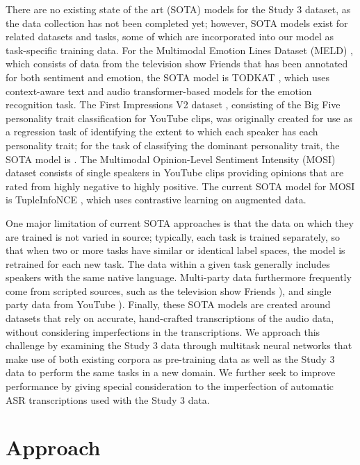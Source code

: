 There are no existing state of the art (SOTA) models for the Study 3 dataset, as the
data collection has not been completed yet; however, SOTA models
exist for related datasets and tasks, some of which are incorporated into our
model as task-specific training data. For the Multimodal Emotion Lines Dataset (MELD)
\cite{Poria.ea:2019}, which consists of data from the television show Friends that
has been annotated for both sentiment and emotion, the
SOTA model is TODKAT \cite{Zhu.ea:2021}, which uses context-aware
text and audio transformer-based models for the emotion recognition task. The
First Impressions V2 dataset \cite{Ponce-Lopez.ea:2016}, consisting of the Big
Five personality trait classification for YouTube clips, was originally created
for use as a regression task of identifying the extent to which each speaker
has each personality trait; for the task of classifying the dominant personality
trait, the SOTA model is \citet{Culnan.ea:2021}. The Multimodal Opinion-Level
Sentiment Intensity (MOSI) dataset \cite{Zadeh.ea:2016} consists of single
speakers in YouTube clips providing opinions that are rated from highly
negative to highly positive. The current SOTA model for MOSI is
TupleInfoNCE \cite{Liu.ea:2021}, which uses contrastive learning on augmented
data.

One major limitation of current SOTA approaches is that the data on which they
are trained is not varied in source; typically, each task is trained
separately, so that when two or more tasks have similar or identical label
spaces, the model is retrained for each new task. The data within a given task
generally includes speakers with the same native language.  Multi-party data
furthermore frequently come from scripted sources, such as the television show
Friends \cite{Poria.ea:2019, Zhu.ea:2021}), and single party data from YouTube
\cite{Zadeh.ea:2016, Ponce-Lopez.ea:2016}). Finally, these SOTA models are
created around datasets that rely on accurate, hand-crafted transcriptions of
the audio data, without considering imperfections in the transcriptions. We
approach this challenge by examining the Study 3 data through multitask neural
networks that make use of both existing corpora as pre-training data as well as
the Study 3 data to perform the same tasks in a new domain. We further seek to
improve performance by giving special consideration to the imperfection of
automatic ASR transcriptions used with the Study 3 data.


\section{Approach}

